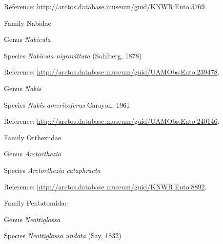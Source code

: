 \documentclass[9pt, article]{memoir}
\begin{document}
\begin{multicols}{2}
\vspace{6pt}Reference: 
\url{http://arctos.database.museum/guid/KNWR:Ento:5769}.

\vspace{6pt}\noindent\hspace{24pt}Family Nabidae


\vspace{6pt}\noindent\hspace{30pt}Genus \textit{Nabicula}


\vspace{6pt}\noindent\hspace{36pt}Species \textit{Nabicula nigrovittata} (Sahlberg, 1878)


\vspace{6pt}Reference: 
\url{http://arctos.database.museum/guid/UAMObs:Ento:239478}.

\vspace{6pt}\noindent\hspace{30pt}Genus \textit{Nabis}


\vspace{6pt}\noindent\hspace{36pt}Species \textit{Nabis americoferus} Carayon, 1961


\vspace{6pt}Reference: 
\url{http://arctos.database.museum/guid/UAMObs:Ento:240146}.

\vspace{6pt}\noindent\hspace{24pt}Family Ortheziidae


\vspace{6pt}\noindent\hspace{30pt}Genus \textit{Arctorthezia}


\vspace{6pt}\noindent\hspace{36pt}Species \textit{Arctorthezia cataphracta}


\vspace{6pt}Reference: 
\url{http://arctos.database.museum/guid/KNWR:Ento:8892}.

\vspace{6pt}\noindent\hspace{24pt}Family Pentatomidae


\vspace{6pt}\noindent\hspace{30pt}Genus \textit{Neottiglossa}


\vspace{6pt}\noindent\hspace{36pt}Species \textit{Neottiglossa undata} (Say, 1832)



\end{multicols}
\end{document}
